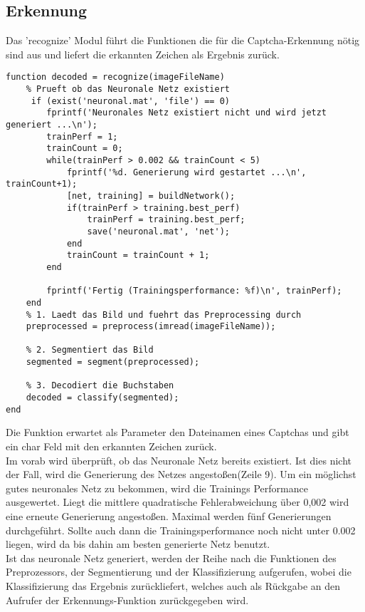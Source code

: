 \subsection{Erkennung}
Das 'recognize' Modul führt die Funktionen die für die Captcha-Erkennung nötig sind aus und liefert die erkannten Zeichen als Ergebnis zurück.
\begin{lstlisting}
function decoded = recognize(imageFileName)
    % Prueft ob das Neuronale Netz existiert
     if (exist('neuronal.mat', 'file') == 0)
        fprintf('Neuronales Netz existiert nicht und wird jetzt generiert ...\n');
        trainPerf = 1;
        trainCount = 0;
        while(trainPerf > 0.002 && trainCount < 5)
            fprintf('%d. Generierung wird gestartet ...\n', trainCount+1);
            [net, training] = buildNetwork();
            if(trainPerf > training.best_perf)
                trainPerf = training.best_perf;
                save('neuronal.mat', 'net');
            end
            trainCount = trainCount + 1;
        end
    
        fprintf('Fertig (Trainingsperformance: %f)\n', trainPerf);
    end
    % 1. Laedt das Bild und fuehrt das Preprocessing durch
    preprocessed = preprocess(imread(imageFileName));
    
    % 2. Segmentiert das Bild
    segmented = segment(preprocessed);
    
    % 3. Decodiert die Buchstaben
    decoded = classify(segmented);
end
\end{lstlisting}
Die Funktion erwartet als Parameter den Dateinamen eines Captchas und gibt ein char Feld mit den erkannten Zeichen zurück.\\
Im vorab wird überprüft, ob das Neuronale Netz bereits existiert. Ist dies nicht der Fall, wird die Generierung des Netzes angestoßen(Zeile 9). Um ein möglichst gutes neuronales Netz zu bekommen, wird die Trainings Performance ausgewertet. Liegt die mittlere quadratische Fehlerabweichung über 0,002 wird eine erneute Generierung angestoßen. Maximal werden fünf Generierungen durchgeführt. Sollte auch dann die Trainingsperformance noch nicht unter 0.002 liegen, wird da bis dahin am besten generierte Netz benutzt.\\
Ist das neuronale Netz generiert, werden der Reihe nach die Funktionen des Preprozessors, der Segmentierung und der Klassifizierung aufgerufen, wobei die Klassifizierung das Ergebnis zurückliefert, welches auch als Rückgabe an den Aufrufer der Erkennungs-Funktion zurückgegeben wird.
\newpage
